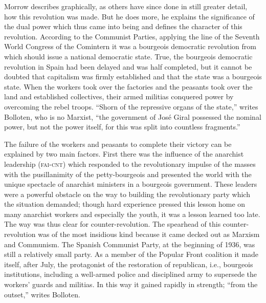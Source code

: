 Morrow describes graphically, as others have since done in still greater detail, how this revolution was made. But he does more, he explains the significance of the dual power which thus came into being and defines the character of this revolution. According to the Communist Parties, applying the line of the Seventh World Congress of the Comintern\label{en:BollotenGrandCamouflageP42} it was a bourgeois democratic revolution from which should issue a national democratic state. True, the bourgeois democratic revolution in Spain had been delayed and was half completed, but it cannot be doubted that capitalism was firmly established and that the state was a bourgeois state. When the workers took over the factories and the peasants took over the land and established collectives, their armed militias conquered power by overcoming the rebel troops. ``Shorn of the repressive organs of the state,'' writes Bolloten{\indexBBolloten}, who is no Marxist, ``the government of Jos\'e Giral{\indexJGiral} possessed the nominal power, but not the power itself, for this was split into countless fragments.''\endnotemark[\ref{en:BollotenGrandCamouflageP42}]

The failure of the workers and peasants to complete their victory can be explained by two main factors. First there was the influence of the anarchist leadership (\textsc{fai-cnt}) which responded to the revolutionary impulse of the masses with the pusillanimity of the petty-bourgeois and presented the world with the unique spectacle of anarchist ministers in a bourgeois government. These leaders were a powerful obstacle on the way to building the revolutionary party which the situation demanded; though hard experience pressed this lesson home on many anarchist workers and especially the youth, it was a lesson learned too late. The way was thus clear for counter-revolution. The spearhead of this counter-revolution was of the most insidious kind because it came decked out as Marxism and Communism. The Spanish Communist Party\indexPCE, at the beginning of 1936, was still a relatively small party. As a member of the Popular Front coalition it made itself, after July, the protagonist of the restoration of republican, i.e., bourgeois institutions, including a well-armed police and disciplined army to supersede the workers’ guards and militias. In this way it gained rapidly in strength; ``from the outset,'' writes Bolloten.


